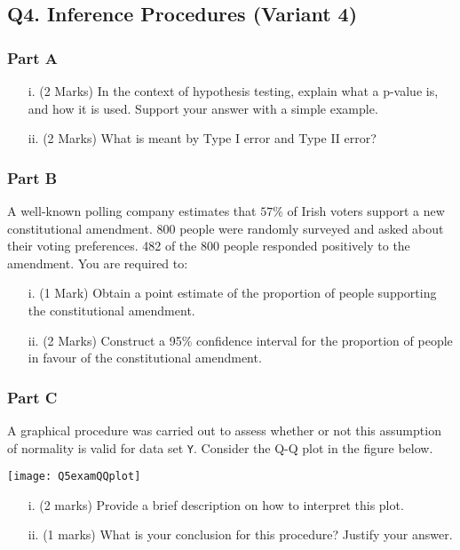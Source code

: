 \documentclass[a4paper,12pt]{article}
\begin{document}
\newpage
\subsection*{Q4. Inference Procedures (Variant 4)}
\subsubsection*{Part A} %
\begin{itemize}
\item[i.](2 Marks) In the context of hypothesis testing, explain what a p-value is, and how it is used. Support your answer with a simple example.
\item[ii.](2 Marks) What is meant by Type I error and Type II error?
\end{itemize}
\subsubsection*{Part B} %
A well-known polling company estimates that $57\%$ of Irish voters support a new constitutional amendment. 800 people were randomly surveyed and asked about their voting preferences. 482 of the 800 people responded positively to the amendment. You are required to:

\begin{itemize}
\item [i.](1 Mark) Obtain a point estimate of the proportion of people supporting the constitutional amendment.
\item [ii.](2 Marks) Construct a 95\% confidence interval for the proportion of people in favour of the constitutional amendment.
\end{itemize}


\subsubsection*{Part C} %
A graphical procedure was carried out to assess whether or not this assumption of normality is valid for data set \texttt{Y}. Consider the Q-Q plot in the figure below.

\begin{center}
\texttt{[image: Q5examQQplot]}
\end{center}

\begin{itemize}
\item[i.] (2 marks) Provide a brief description on how to interpret this plot.
\item[ii.] (1 marks) What is your conclusion for this procedure? Justify your answer.
\end{itemize}
\newpage
\end{document}
